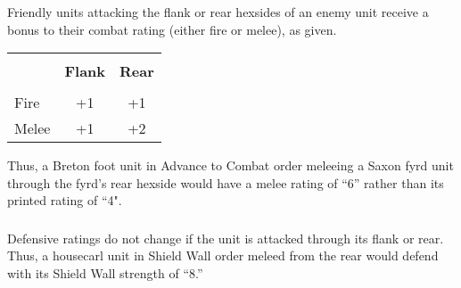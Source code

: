 \subsubsection[Flank or Rear]{} Friendly units attacking the flank or rear hexsides of an enemy unit receive a bonus to their combat rating (either fire or melee), as given.

\begin{tabular}{ |lcc| }
  \hline & & \\[-2.0ex]
  & \textbf{Flank} & \textbf{Rear} \\
  \hline & &\\ [-2.0ex]
  Fire & +1 & +1 \\
  Melee & +1 & +2 \\
  \hline
\end{tabular}

Thus, a Breton foot unit in Advance to Combat order meleeing a Saxon fyrd unit through the fyrd's rear hexside would have a melee rating of “6” rather than its printed rating of “4".

\subsubsection[Defensive Ratings]{} Defensive ratings do not change if the unit is attacked through its flank or rear. Thus, a housecarl unit in Shield Wall order meleed from the rear would defend with its Shield Wall strength of “8.”
